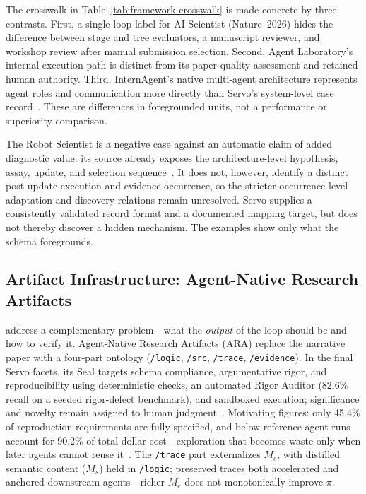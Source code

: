 \documentclass{article}
\begin{document}
The crosswalk in Table~\ref{tab:framework-crosswalk} is made concrete by three contrasts. First, a single loop label for AI Scientist (Nature~2026) hides the difference between stage and tree evaluators, a manuscript reviewer, and workshop review after manual submission selection. Second, Agent Laboratory's internal execution path is distinct from its paper-quality assessment and retained human authority. Third, InternAgent's native multi-agent architecture represents agent roles and communication more directly than Servo's system-level case record~\citep{zhang2025novelseek}. These are differences in foregrounded units, not a performance or superiority comparison.

The Robot Scientist is a negative case against an automatic claim of added diagnostic value: its source already exposes the architecture-level hypothesis, assay, update, and selection sequence~\citep{king2004robot,sparkes2010robot}. It does not, however, identify a distinct post-update execution and evidence occurrence, so the stricter occurrence-level adaptation and discovery relations remain unresolved. Servo supplies a consistently validated record format and a documented mapping target, but does not thereby discover a hidden mechanism. The examples show only what the schema foregrounds.

\subsection{Artifact Infrastructure: Agent-Native Research Artifacts}
\label{sec:ara}

\citet{liu2026lasthuman} address a complementary problem---what the \emph{output} of the loop should be and how to verify it. Agent-Native Research Artifacts (ARA) replace the narrative paper with a four-part ontology (\texttt{/logic}, \texttt{/src}, \texttt{/trace}, \texttt{/evidence}). In the final Servo facets, its Seal targets schema compliance, argumentative rigor, and reproducibility using deterministic checks, an automated Rigor Auditor (82.6\% recall on a seeded rigor-defect benchmark), and sandboxed execution; significance and novelty remain assigned to human judgment~\citep{liu2026lasthuman}. Motivating figures: only 45.4\% of reproduction requirements are fully specified, and below-reference agent runs account for 90.2\% of total dollar cost---exploration that becomes waste only when later agents cannot reuse it~\citep{liu2026lasthuman}. The \texttt{/trace} part externalizes $M_e$, with distilled semantic content ($M_s$) held in \texttt{/logic}; preserved traces both accelerated and anchored downstream agents---richer $M_e$ does not monotonically improve $\pi$.
\end{document}

